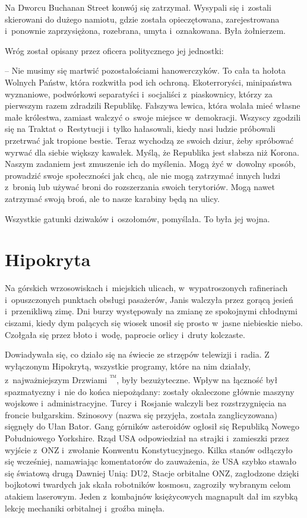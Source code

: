 \documentclass[oneside,polish,11pt,sfheadings]{mwbk}
\begin{document}
Na Dworcu Buchanan Street konwój się zatrzymał. Wysypali się i~zostali
skierowani do dużego namiotu, gdzie została opieczętowana,
zarejestrowana i~ponownie zaprzysiężona, rozebrana, umyta i~oznakowana.
Była żołnierzem.

Wróg został opisany przez oficera politycznego jej jednostki: 

-- Nie
musimy się martwić pozostałościami hanowerczyków. To cała ta hołota
Wolnych Państw, która rozkwitła pod ich ochroną. Ekoterroryści,
minipaństwa wyznaniowe, podwórkowi separatyści i~socjaliści z~piaskownicy, którzy za pierwszym razem zdradzili Republikę. Fałszywa
lewica, która wolała mieć własne małe królestwa, zamiast walczyć o~swoje
miejsce w~demokracji. Wszyscy zgodzili się na Traktat o~Restytucji i~tylko hałasowali, kiedy nasi ludzie próbowali przetrwać jak tropione
bestie. Teraz wychodzą ze swoich dziur, żeby spróbować wyrwać dla siebie
większy kawałek. Myślą, że Republika jest słabsza niż Korona. Naszym
zadaniem jest zmuszenie ich do myślenia. Mogą żyć w~dowolny sposób,
prowadzić swoje społeczności jak chcą, ale nie mogą zatrzymać innych
ludzi z~bronią lub używać broni do rozszerzania swoich terytoriów. Mogą
nawet zatrzymać swoją broń, ale to nasze karabiny będą na ulicy.

Wszystkie gatunki dziwaków i~oszołomów, pomyślała. To była jej wojna.

\chapter{Hipokryta}

Na górskich wrzosowiskach i~miejskich ulicach, w~wypatroszonych
rafineriach i~opuszczonych punktach obsługi pasażerów, Janis walczyła
przez gorącą jesień i~przenikliwą zimę. Dni burzy występowały na zmianę
ze spokojnymi chłodnymi ciszami, kiedy dym palących się wiosek unosił
się prosto w~jasne niebieskie niebo. Czołgała się przez błoto i~wodę,
paprocie orlicy i~druty kolczaste.

Dowiadywała się, co działo się na świecie ze strzępów telewizji i~radia.
Z wyłączonym Hipokrytą, wszystkie programy, które na nim działały, z~najważniejszym Drzwiami \textsuperscript{™}, były bezużyteczne. Wpływ na
łączność był spazmatyczny i~nie do końca niepożądany: zostały okaleczone
głównie maszyny wojskowe i~administracyjne. Turcy i~Rosjanie walczyli
bez rozstrzygnięcia na froncie bułgarskim. Szinosovy (nazwa się
przyjęła, została zanglicyzowana) sięgnęły do Ułan Bator. Gang górników
asteroidów ogłosił się Republiką Nowego Południowego Yorkshire. Rząd USA
odpowiedział na strajki i~zamieszki przez wyjście z~ONZ i~zwołanie
Konwentu Konstytucyjnego. Kilka stanów odłączyło się wcześniej,
namawiając komentatorów do zauważenia, że USA szybko stawało się
światową drugą Dawniej Unią: DU2, Stacje orbitalne ONZ, zagłodzone
dzięki bojkotowi twardych jak skała robotników kosmosu, zagroziły
wybranym celom atakiem laserowym. Jeden z~kombajnów księżycowych
magnapult dał im szybką lekcję mechaniki orbitalnej i~groźba minęła.
\end{document}
